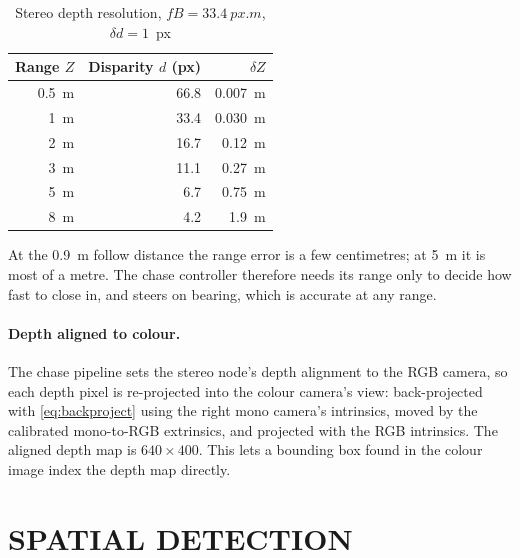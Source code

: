 \begin{table}[htbp]
\centering
\caption{Stereo depth resolution, $fB=\SI{33.4}{px.m}$, $\delta d=1$~px}
\label{tab:depthres}
\small
\begin{tabular}{rrr}
\toprule
Range $Z$ & Disparity $d$ (px) & $\delta Z$ \\
\midrule
\SI{0.5}{m} & 66.8 & \SI{0.007}{m} \\
\SI{1}{m} & 33.4 & \SI{0.030}{m} \\
\SI{2}{m} & 16.7 & \SI{0.12}{m} \\
\SI{3}{m} & 11.1 & \SI{0.27}{m} \\
\SI{5}{m} & 6.7 & \SI{0.75}{m} \\
\SI{8}{m} & 4.2 & \SI{1.9}{m} \\
\bottomrule
\end{tabular}
\end{table}

At the \SI{0.9}{m} follow distance the range error is a few centimetres; at
\SI{5}{m} it is most of a metre. The chase controller therefore needs its
range only to decide how fast to close in, and steers on bearing, which is
accurate at any range.

\paragraph{Depth aligned to colour.} The chase pipeline sets the stereo
node's depth alignment to the RGB camera, so each depth pixel is re-projected
into the colour camera's view: back-projected with \eqref{eq:backproject}
using the right mono camera's intrinsics, moved by the calibrated
mono-to-RGB extrinsics, and projected with the RGB intrinsics. The aligned
depth map is $640\times400$. This lets a bounding box found in the colour
image index the depth map directly.

\section{SPATIAL DETECTION}
\label{sec:spatial}

